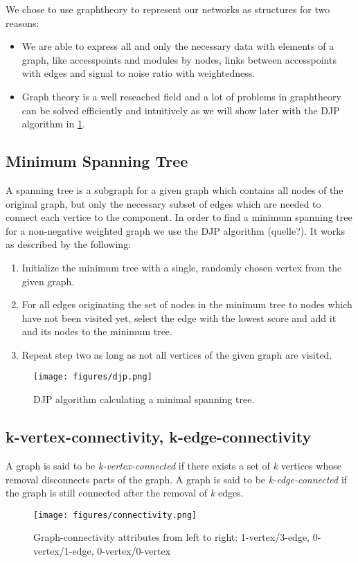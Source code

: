   We chose to use graphtheory to represent our networks as structures for two reasons:
  \begin{itemize}
   \item We are able to express all and only the necessary data with elements of a graph, like
    accesspoints and modules by nodes, links between accesspoints with edges and signal to noise ratio with weightedness. 
   \item Graph theory is a well reseached field and a lot of problems in graphtheory can be solved efficiently and intuitively 
    as we will show later with the \ac{DJP} algorithm in \ref{fig:djp}.
  \end{itemize}
    
  \subsection{Minimum Spanning Tree}
    A spanning tree is a subgraph for a given graph which contains all nodes of the original graph, but only the necessary subset of edges which are needed to connect each vertice
    to the component. In order to find a minimum spanning tree for a non-negative weighted graph we use the DJP algorithm (quelle?).
    It works as described by the following:
    \begin{enumerate}
     \item Initialize the minimum tree with a single, randomly chosen vertex from the given graph.
     \item For all edges originating the set of nodes in the minimum tree to nodes which have not been visited yet, select the edge with the lowest score and add it and its nodes 
      to the minimum tree.
     \item Repeat step two as long as not all vertices of the given graph are visited.
    \end{enumerate}
    \begin{figure}[th!]
      \centering
      \texttt{[image: figures/djp.png]}
      \caption{DJP algorithm calculating a minimal spanning tree.}
      \label{fig:djp}
    \end{figure}
    
  \subsection{k-vertex-connectivity, k-edge-connectivity}
    A graph is said to be \textit{k-vertex-connected} if there exists a set of \textit{k} vertices whose removal disconnects parts of the graph.\newline
    A graph is said to be \textit{k-edge-connected} if the graph is still connected after the removal of \textit{k} edges.
    \begin{figure}[th!]
      \centering
      \texttt{[image: figures/connectivity.png]}
      \caption{Graph-connectivity attributes from left to right: 1-vertex/3-edge, 0-vertex/1-edge, 0-vertex/0-vertex}
      \label{fig:connectivity}
    \end{figure}
    
